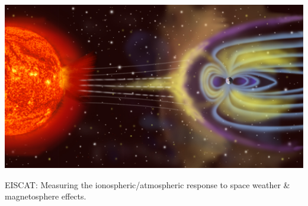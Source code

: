 \begin{frame}[fragile,t]
\frametitle{\hfill}
\vspace{\mytopbit}
  \begin{center}
    \includegraphics[width=\columnwidth]{popscise}
  \end{center}
EISCAT: Measuring the ionospheric/atmospheric response to space weather \& magnetosphere effects.
\end{frame}
